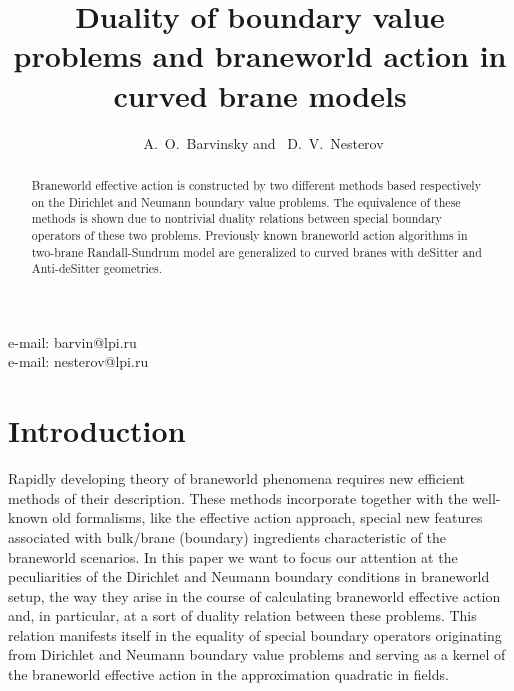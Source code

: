 \documentclass[a4paper,12pt]{article}
\begin{document}
\title{\bf Duality of boundary value problems and braneworld action
in curved brane models}
\author{~A.~O.~Barvinsky\myHighlight{$^{\dag}$}\coordHE{} and  ~D.~V.~Nesterov\myHighlight{$^{\star}$}\coordHE{}}
\maketitle
 \begin{center}

  \hspace{-0mm}{\em Theory Department, Lebedev Physics
  Institute,
  Leninsky Prospect 53, Moscow 11999,\\ Russia}
 \end{center}

\begin{abstract}
Braneworld effective action is constructed by two different
methods based respectively on the Dirichlet and Neumann boundary
value problems. The equivalence of these methods is shown due to
nontrivial duality relations between special boundary operators of
these two problems. Previously known braneworld action algorithms
in two-brane Randall-Sundrum model are generalized to curved
branes with deSitter and Anti-deSitter geometries.
\end{abstract}
\noindent
\myHighlight{$^{\dag}$}\coordHE{}e-mail: barvin@lpi.ru\\
\noindent
\myHighlight{$^{\star}$}\coordHE{}e-mail: nesterov@lpi.ru\\


\section{Introduction}
\hspace{\parindent}Rapidly developing theory of braneworld
phenomena \cite{Ant,string,hierarchy} requires new efficient
methods of their description. These methods incorporate together
with the well-known old formalisms, like the effective action
approach, special new features associated with bulk/brane
(boundary) ingredients characteristic of the braneworld scenarios.
In this paper we want to focus our attention at the peculiarities
of the Dirichlet and Neumann boundary conditions in braneworld
setup, the way they arise in the course of calculating braneworld
effective action and, in particular, at a sort of duality relation
between these problems. This relation manifests itself in the
equality of special boundary operators originating from Dirichlet
and Neumann boundary value problems and serving as a kernel of the
braneworld effective action in the approximation quadratic in
fields.
\end{document}
